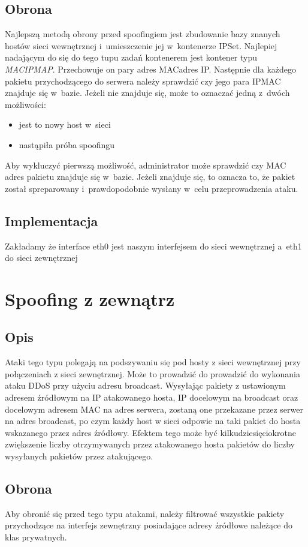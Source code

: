\documentclass[a4paper,12pt]{book}
\begin{document}
		\subsection{Obrona}
			Najlepszą metodą obrony przed spoofingiem jest zbudowanie bazy znanych hostów sieci wewnętrznej i~umieszczenie jej w~kontenerze IPSet.
			Najlepiej nadającym do się do tego tupu zadań kontenerem jest kontener typu \textit{MACIPMAP}.
			Przechowuje on pary adres MAC\dywiz adres IP.
			Następnie dla każdego pakietu przychodzącego do serwera należy sprawdzić czy jego para IP\dywiz MAC znajduje się w~bazie.
			Jeżeli nie znajduje się, może to oznaczać jedną z~dwóch możliwości:
			\begin{itemize}
				\item jest to nowy host w~sieci
				\item nastąpiła próba spoofingu
			\end{itemize}
			Aby wykluczyć pierwszą możliwość, administrator może sprawdzić czy MAC adres pakietu znajduje się w~bazie.
			Jeżeli znajduje się, to oznacza to, że pakiet został spreparowany i~prawdopodobnie wysłany w~celu przeprowadzenia ataku.
		\subsection{Implementacja}
			\footnotesize
			Zakładamy że interface eth0 jest naszym interfejsem do sieci wewnętrznej a~eth1 do sieci zewnętrznej
			\normalsize
	\section{Spoofing z zewnątrz}
		\subsection{Opis}
			Ataki tego typu polegają na podszywaniu się pod hosty z sieci wewnętrznej przy połączeniach z sieci zewnętrznej.
			Może to prowadzić do prowadzić do wykonania ataku DDoS przy użyciu adresu broadcast. 
			Wysyłając pakiety z ustawionym adresem źródłowym na IP atakowanego hosta, IP docelowym na broadcast oraz docelowym adresem MAC na adres serwera, zostaną one przekazane przez serwer na adres broadcast, po czym każdy host w sieci odpowie na taki pakiet do hosta wskazanego przez adres źródłowy.
			Efektem tego może być kilkudziesięciokrotne zwiększenie liczby otrzymywanych przez atakowanego hosta pakietów do liczby wysyłanych pakietów przez atakującego.
		\subsection{Obrona}
			Aby obronić się przed tego typu atakami, należy filtrować wszystkie pakiety przychodzące na interfejs zewnętrzny posiadające adresy źródłowe należące do klas prywatnych.
\end{document}
